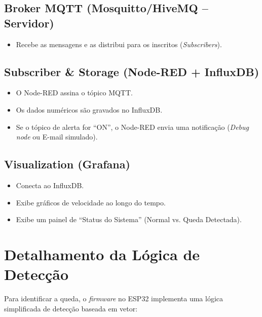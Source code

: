 \documentclass[a4paper,12pt]{article}
\begin{document}
\subsection{Broker MQTT (Mosquitto/HiveMQ -- Servidor)}

\begin{itemize}
    \item Recebe as mensagens e as distribui para os inscritos (\textit{Subscribers}).
\end{itemize}

\subsection{Subscriber \& Storage (Node-RED + InfluxDB)}

\begin{itemize}
    \item O Node-RED assina o tópico MQTT.
    \item Os dados numéricos são gravados no InfluxDB.
    \item Se o tópico de alerta for ``ON'', o Node-RED envia uma notificação (\textit{Debug node} ou E-mail simulado).
\end{itemize}

\subsection{Visualization (Grafana)}

\begin{itemize}
    \item Conecta ao InfluxDB.
    \item Exibe gráficos de velocidade ao longo do tempo.
    \item Exibe um painel de ``Status do Sistema'' (Normal vs. Queda Detectada).
\end{itemize}

\section{Detalhamento da Lógica de Detecção}

Para identificar a queda, o \textit{firmware} no ESP32 implementa uma lógica simplificada de detecção baseada em vetor:
\end{document}
